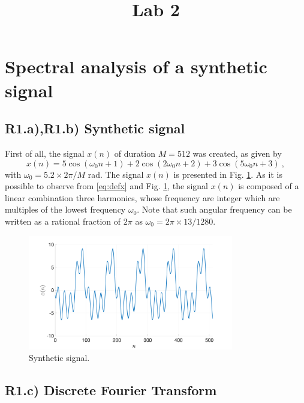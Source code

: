 \documentclass[]{scrartcl}
\title{Lab 2}
\author{}
\begin{document}
\maketitle

\begin{abstract}

\end{abstract}

\section{Spectral analysis of a synthetic signal}

\subsection{R1.a),R1.b) Synthetic signal}\label{sec:R1a}
First of all, the signal $x(n)$ of duration $M=512$ was created, as given by 
\begin{equation}\label{eq:defx}
	x(n) = 5\cos(\omega_0 n +1)+2\cos(2\omega_0 n +2)+3\cos(5\omega_0 n +3)\:,
\end{equation}
with $\omega_0 = 5.2\times 2\pi/M$ rad. The signal $x(n)$ is presented in Fig. \ref{fig:R1b}. As it is possible to observe from \eqref{eq:defx} and Fig. \ref{fig:R1b}, the signal $x(n)$ is composed of a linear combination three harmonics, whose frequency are integer which are multiples of the lowest frequency $\omega_0$. Note that such angular frequency can be written as a rational fraction of $2\pi$ as $\omega_0 = 2\pi \times 13/1280$.
\begin{figure}[htbp]
	\centering
	\includegraphics[width= 0.8\textwidth]{figures/R1b.png}
	\caption{Synthetic signal.}
	\label{fig:R1b}
\end{figure}

\subsection{R1.c) Discrete Fourier Transform}
\end{document}
